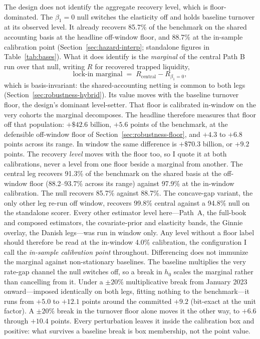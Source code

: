 \documentclass[12pt]{article}
\begin{document}
The design does not identify the aggregate recovery level, which is floor-dominated. The $\beta_1 = 0$ null switches the elasticity off and holds baseline turnover at its observed level. It already recovers 85.7\% of the benchmark on the shared accounting basis at the headline off-window floor, and 88.7\% at the in-sample calibration point (Section~\ref{sec:hazard-interp}; standalone figures in Table~\ref{tab:bases}). What it does identify is the \emph{marginal} of the central Path B run over that null, writing $R$ for recovered trapped liquidity,
\begin{equation}\label{eq:marginal}
\text{lock-in marginal} \;=\; R_{\text{central}} - R_{\beta_1 = 0},
\end{equation}
which is basis-invariant: the shared-accounting netting is common to both legs (Section~\ref{sec:robustness-hybrid}). Its value moves with the baseline turnover floor, the design's dominant level-setter. That floor is calibrated in-window on the very cohorts the marginal decomposes. The headline therefore measures that floor off that population: $+\$42.6$ billion, $+5.6$ points of the benchmark, at the defensible off-window floor of Section~\ref{sec:robustness-floor}, and $+4.3$ to $+6.8$ points across its range. In window the same difference is $+\$70.3$ billion, or $+9.2$ points. The recovery \emph{level} moves with the floor too, so I quote it at both calibrations, never a level from one floor beside a marginal from another. The central leg recovers 91.3\% of the benchmark on the shared basis at the off-window floor (88.2--93.7\% across its range) against 97.9\% at the in-window calibration. The null recovers 85.7\% against 88.7\%. The concave-gap variant, the only other leg re-run off window, recovers 99.8\% central against a 94.8\% null on the standalone scorer. Every other estimator level here---Path~A, the full-book and composed estimators, the covariate-prior and elasticity bands, the Ginnie overlay, the Danish legs---was run in window only. Any level without a floor label should therefore be read at the in-window 4.0\% calibration, the configuration I call the \emph{in-sample calibration point} throughout. Differencing does not immunize the marginal against non-stationary baselines. The baseline multiplies the very rate-gap channel the null switches off, so a break in $h_0$ scales the marginal rather than cancelling from it. Under a $\pm 20\%$ multiplicative break from January 2023 onward---imposed identically on both legs, fitting nothing to the benchmark---it runs from $+5.0$ to $+12.1$ points around the committed $+9.2$ (bit-exact at the unit factor). A $\pm 20\%$ break in the turnover floor alone moves it the other way, to $+6.6$ through $+10.4$ points. Every perturbation leaves it inside the calibration box and positive: what survives a baseline break is box membership, not the point value.
\end{document}
